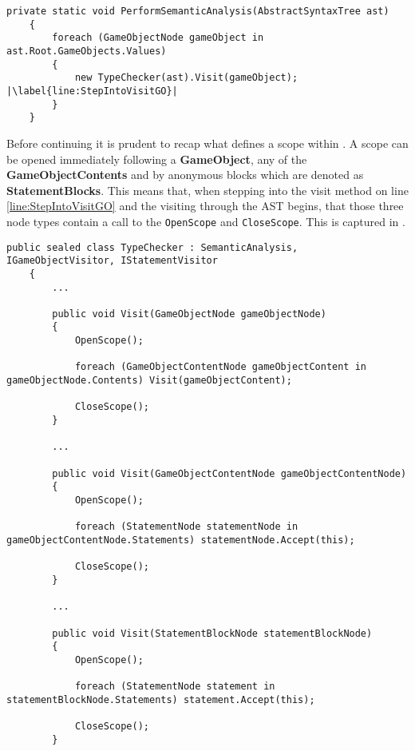 \begin{lstlisting}[caption={Typechecker object for every gameObject}, label={lst:TypeCheckEachGO},escapechar=|]
    private static void PerformSemanticAnalysis(AbstractSyntaxTree ast)
    {
        foreach (GameObjectNode gameObject in ast.Root.GameObjects.Values)
        {
            new TypeChecker(ast).Visit(gameObject); |\label{line:StepIntoVisitGO}|
        }
    }
\end{lstlisting}

Before continuing it is prudent to recap what defines a scope within \dazel{}. A scope can be opened immediately following a \textbf{GameObject}, any of the \textbf{GameObjectContents} and by anonymous blocks which are denoted as \textbf{StatementBlocks}. This means that, when stepping into the visit method on line \ref{line:StepIntoVisitGO} and the visiting through the AST begins, that those three node types contain a call to the \texttt{OpenScope} and \texttt{CloseScope}. This is captured in .

\begin{lstlisting}[caption={Applying Scope to GameObjects, GameObjectContents and StatementBlocks}, label={lst:ApplyScope},escapechar=|]
    public sealed class TypeChecker : SemanticAnalysis, IGameObjectVisitor, IStatementVisitor
    {
        ...

        public void Visit(GameObjectNode gameObjectNode)
        {
            OpenScope();

            foreach (GameObjectContentNode gameObjectContent in gameObjectNode.Contents) Visit(gameObjectContent);

            CloseScope();
        }

        ...

        public void Visit(GameObjectContentNode gameObjectContentNode)
        {
            OpenScope();

            foreach (StatementNode statementNode in gameObjectContentNode.Statements) statementNode.Accept(this);

            CloseScope();
        }

        ... 

        public void Visit(StatementBlockNode statementBlockNode)
        {
            OpenScope();

            foreach (StatementNode statement in statementBlockNode.Statements) statement.Accept(this);

            CloseScope();
        }
\end{lstlisting}

